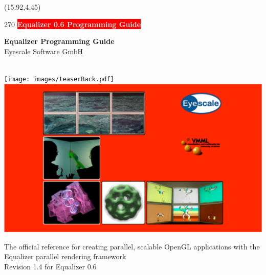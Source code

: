 \documentclass[10pt]{scrartcl}
\newcommand{\boxwidth}{5in}
\newcommand{\spacewidth}{604pt}
\begin{document}
\thispagestyle{empty}

\begin{textblock}{}(15.92,4.45)
  \begin{rotate}{270}
    \colorbox{red}{\textsf{\bfseries\Large\textcolor{white}{
          \hspace{2.09cm}Equalizer 0.6 Programming Guide\hspace{2.09cm}}}}
  \end{rotate}
\end{textblock}

\vfill
\parbox[t]{\spacewidth}{\hfill}
\parbox[t]{\boxwidth}{
  \center
  \textsf{\textbf{\huge Equalizer Programming Guide}}\\[\bigskipamount]
  {\Large Eyescale Software GmbH}
}\\
\vfill
\hspace{-128pt}
  \texttt{[image: images/teaserBack.pdf]}
  \hspace{11pt}
  \includegraphics[width=604pt]{images/teaser.pdf}
\\
\vfill
\parbox[t]{\spacewidth}{\hfill}
\parbox[t]{\boxwidth}{ 
  {\Large\sffamily The official reference for creating parallel,
    scalable {OpenGL\texttrademark} applications with the Equalizer
    parallel rendering framework}\\\vspace{1cm}
  \center 
  {\Large Revision 1.4 for Equalizer 0.6}\\[\medskipamount]
}
\end{document}

